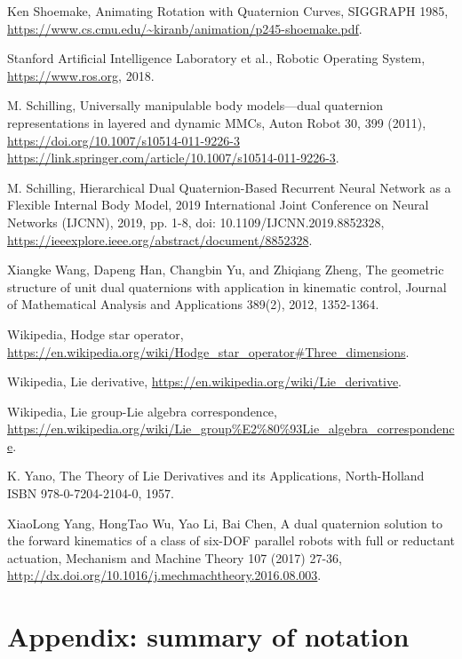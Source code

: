 \documentclass[reqno,12pt]{amsart}
\begin{document}
\begin{thebibliography}{99}
 Ken Shoemake, Animating Rotation with Quaternion Curves, SIGGRAPH 1985, \url{https://www.cs.cmu.edu/~kiranb/animation/p245-shoemake.pdf}.

 Stanford Artificial Intelligence Laboratory et al., Robotic Operating System, \url{https://www.ros.org}, 2018.

  M. Schilling, Universally manipulable body models---dual quaternion representations in layered and dynamic MMCs, Auton Robot 30, 399 (2011), \url{https://doi.org/10.1007/s10514-011-9226-3 https://link.springer.com/article/10.1007/s10514-011-9226-3}.

 M. Schilling, Hierarchical Dual Quaternion-Based Recurrent Neural Network as a Flexible Internal Body Model, 2019 International Joint Conference on Neural Networks (IJCNN), 2019, pp. 1-8, doi: 10.1109/IJCNN.2019.8852328, \url{https://ieeexplore.ieee.org/abstract/document/8852328}.

 Xiangke Wang, Dapeng Han, Changbin Yu, and Zhiqiang Zheng, The geometric structure of unit dual quaternions with application in kinematic control, Journal of Mathematical Analysis and Applications 389(2), 2012, 1352-1364.

 Wikipedia, Hodge star operator, \url{https://en.wikipedia.org/wiki/Hodge_star_operator#Three_dimensions}.

 Wikipedia, Lie derivative, \url{https://en.wikipedia.org/wiki/Lie_derivative}.

 Wikipedia, Lie group-Lie algebra correspondence, \url{https://en.wikipedia.org/wiki/Lie_group%E2%80%93Lie_algebra_correspondence}.

 K. Yano, The Theory of Lie Derivatives and its Applications, North-Holland ISBN 978-0-7204-2104-0, 1957.

 XiaoLong Yang, HongTao Wu, Yao Li, Bai Chen, A dual quaternion solution to the forward kinematics of a class of six-DOF parallel robots with full or reductant actuation, Mechanism and Machine Theory 107 (2017) 27-36, \url{http://dx.doi.org/10.1016/j.mechmachtheory.2016.08.003}.

\end{thebibliography}

\section*{Appendix: summary of notation}
\end{document}
